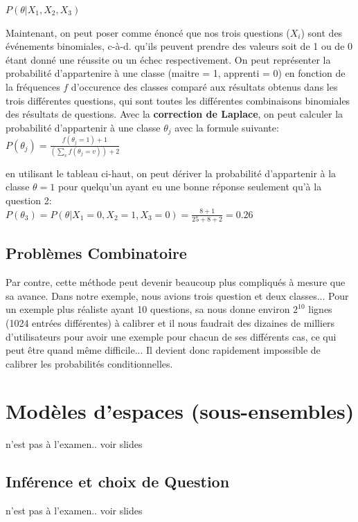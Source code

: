 \documentclass[oneside]{book}
\begin{document}
\centering
$P(\theta | X_1, X_2, X_3)$
\justify

Maintenant, on peut poser comme énoncé que nos trois questions ($X_i$) sont des événements binomiales, c-à-d. qu'ils peuvent prendre des valeurs soit de 1 ou de 0 étant donné une réussite ou un échec respectivement. On peut représenter la probabilité d'appartenire à une classe (maitre = 1, apprenti = 0) en fonction de la fréquences $f$ d'occurence des classes comparé aux résultats obtenus dans les trois différentes questions, qui sont toutes les différentes combinaisons binomiales des résultats de questions. Avec la \textbf{correction de Laplace}, on peut calculer la probabilité d'appartenir à une classe $\theta_j$ avec la formule suivante:\\

\centering
$P(\theta_j) = \frac{f(\theta_j = 1) + 1}{(\sum\limits_v f(\theta_j = v)) + 2}$
\justify

en utilisant le tableau ci-haut, on peut dériver la probabilité d'appartenir à la classe $\theta = 1$ pour quelqu'un ayant eu une bonne réponse seulement qu'à la question 2:\\

\centering
$P(\theta_3) = P(\theta | X_1 = 0, X_2 = 1, X_3 = 0) = \frac{8 + 1}{25 + 8 + 2} = 0.26$\\

\justify


\subsection{Problèmes Combinatoire}
Par contre, cette méthode peut devenir beaucoup plus compliqués à mesure que sa avance. Dans notre exemple, nous avions trois question et deux classes... Pour un exemple plus réaliste ayant 10 questions, sa nous donne environ $2^10$ lignes (1024 entrées différentes) à calibrer et il nous faudrait des dizaines de milliers d'utilisateurs pour avoir une exemple pour chacun de ses différents cas, ce qui peut être quand même difficile... Il devient donc rapidement impossible de calibrer les probabilités conditionnelles. 


\section{Modèles d'espaces (sous-ensembles)}

n'est pas à l'examen.. voir slides
\subsection{Inférence et choix de Question}
n'est pas à l'examen.. voir slides
\end{document}
